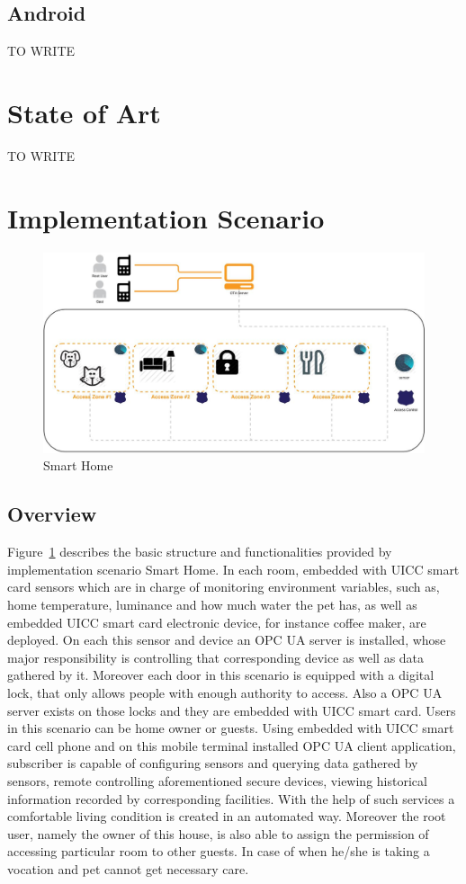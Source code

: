 \documentclass[]{llncs}
\begin{document}
\subsection{Android}

TO WRITE

\section{State of Art}
TO WRITE

\section{Implementation Scenario}
 \begin{figure}[!htbp]
	\centering
	\includegraphics[width=1.2\textwidth]{homeoverview.jpg}
		\caption[ ]{Smart Home}
	\label{fig:SmartHome}
\end{figure}

\subsection{Overview}
Figure~\ref{fig:SmartHome} describes the basic structure and functionalities provided by implementation scenario Smart Home.
In each room, embedded with UICC smart card sensors which are in charge of monitoring environment variables, such as, home temperature, luminance and how much water the pet has, as well as embedded UICC smart card electronic device, for instance coffee maker, are deployed. On each this sensor and device an OPC UA server is installed, whose major responsibility is controlling that corresponding device as well as data gathered by it.  Moreover each door in this scenario is equipped with a digital lock, that only allows people with enough authority to access. Also a OPC UA server exists on those locks and they are embedded with UICC smart card. Users in this scenario can be home owner or guests. Using embedded with UICC smart card cell phone and on this mobile terminal installed OPC UA client application, subscriber is capable of configuring sensors and querying data gathered by sensors, remote controlling aforementioned secure devices, viewing historical information recorded by corresponding facilities. With the help of such services a comfortable living condition is created in an automated way.  Moreover the root user, namely the owner of this house, is also able to assign the permission of accessing particular room to other guests. In case of when he/she is taking a vocation and pet cannot get necessary care.
\end{document}
